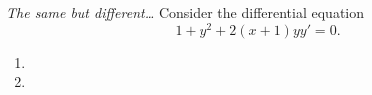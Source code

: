 \textit{The same but different\dots} Consider the differential equation $$1 + y^2 + 2(x+1)yy' = 0.$$
\begin{enumerate}
    \item  \newpage
    \item 
  \end{enumerate}